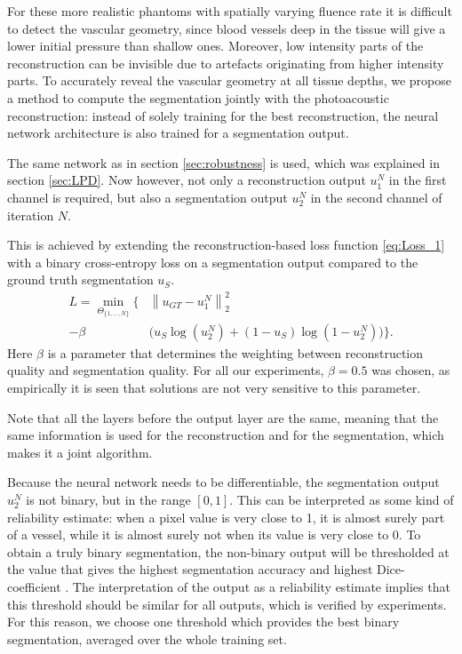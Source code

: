 \documentclass[journal]{IEEEtran}
\newcommand{\norm}[1]{\left\lVert#1\right\rVert}
\newcommand{\hl}[1]{\cbcolor{red}\begin{changebar}{#1}\end{changebar}}
\begin{document}
For these more realistic phantoms with spatially varying fluence rate it is difficult to detect the vascular geometry, since blood vessels deep in the tissue will give a lower initial pressure than shallow ones. Moreover, low intensity parts of the reconstruction can be invisible due to artefacts originating from higher intensity parts. To accurately reveal the vascular geometry at all tissue depths, we propose a method to compute the segmentation jointly with the photoacoustic reconstruction: instead of solely training for the best reconstruction, the neural network architecture is also trained for a segmentation output. \hl{The same network as in section \ref{sec:robustness} is used, which was explained in section \ref{sec:LPD}. Now however, not only a reconstruction output $u_1^N$ in the first channel is required, but also a segmentation output $u_2^N$ in the second channel of iteration $N$.} This is achieved by extending the reconstruction-based loss function \eqref{eq:Loss_1} with a binary cross-entropy loss on a segmentation output compared to the ground truth segmentation $u_S$.
\begin{align}\label{eq:Loss_2}
L=\min_{\Theta_{\{1,\dots,N\}}}\Big\{&\norm{u_{GT}-u_1^N}^2_2 \\- \beta &\Big(u_S\log(u_2^N)+(1-u_S)\log(1-u_2^N)\Big)\Big\}.\nonumber
\end{align}
Here $\beta$ is a parameter that determines the weighting between reconstruction quality and segmentation quality. For all our experiments, $\beta=0.5$ was chosen, as empirically it is seen that solutions are not very sensitive to this parameter. \hl{Note that all the layers before the output layer are the same, meaning that the same information is used for the reconstruction and for the segmentation, which makes it a joint algorithm.}

Because the neural network needs to be differentiable, the segmentation output $u_2^N$ is not binary, but in the range $[0,1]$. This can be interpreted as some kind of reliability estimate: when a pixel value is very close to 1, it is almost surely part of a vessel, while it is almost surely not when its value is very close to 0. To obtain a truly binary segmentation, the non-binary output will be thresholded at the value that gives the highest segmentation accuracy and highest Dice-coefficient \cite{Zijdenbos1994}. The interpretation of the output as a reliability estimate implies that this threshold should be similar for all outputs, which is verified by experiments. For this reason, we choose one threshold which provides the best binary segmentation, averaged over the whole training set.
\end{document}
